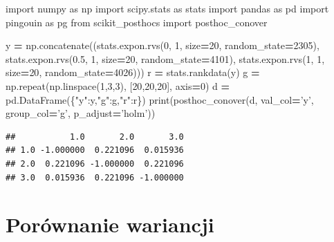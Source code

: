 \documentclass[polish,]{book}
\newenvironment{Shaded}{\begin{snugshade}}{\end{snugshade}}
\newcommand{\BuiltInTok}[1]{#1}
\newcommand{\DecValTok}[1]{\textcolor[rgb]{0.00,0.00,0.81}{#1}}
\newcommand{\FloatTok}[1]{\textcolor[rgb]{0.00,0.00,0.81}{#1}}
\newcommand{\ImportTok}[1]{#1}
\newcommand{\NormalTok}[1]{#1}
\newcommand{\OperatorTok}[1]{\textcolor[rgb]{0.81,0.36,0.00}{\textbf{#1}}}
\newcommand{\StringTok}[1]{\textcolor[rgb]{0.31,0.60,0.02}{#1}}
\begin{document}
\begin{Shaded}
\begin{Highlighting}[]
\ImportTok{import}\NormalTok{ numpy }\ImportTok{as}\NormalTok{ np}
\ImportTok{import}\NormalTok{ scipy.stats }\ImportTok{as}\NormalTok{ stats}
\ImportTok{import}\NormalTok{ pandas }\ImportTok{as}\NormalTok{ pd}
\ImportTok{import}\NormalTok{ pingouin }\ImportTok{as}\NormalTok{ pg}
\ImportTok{from}\NormalTok{ scikit_posthocs }\ImportTok{import}\NormalTok{ posthoc_conover}

\NormalTok{y }\OperatorTok{=}\NormalTok{ np.concatenate((stats.expon.rvs(}\DecValTok{0}\NormalTok{, }\DecValTok{1}\NormalTok{, size}\OperatorTok{=}\DecValTok{20}\NormalTok{, random_state}\OperatorTok{=}\DecValTok{2305}\NormalTok{),}
\NormalTok{                    stats.expon.rvs(}\FloatTok{0.5}\NormalTok{, }\DecValTok{1}\NormalTok{, size}\OperatorTok{=}\DecValTok{20}\NormalTok{, random_state}\OperatorTok{=}\DecValTok{4101}\NormalTok{),}
\NormalTok{                    stats.expon.rvs(}\DecValTok{1}\NormalTok{, }\DecValTok{1}\NormalTok{, size}\OperatorTok{=}\DecValTok{20}\NormalTok{, random_state}\OperatorTok{=}\DecValTok{4026}\NormalTok{)))}
\NormalTok{r }\OperatorTok{=}\NormalTok{ stats.rankdata(y)}
\NormalTok{g }\OperatorTok{=}\NormalTok{ np.repeat(np.linspace(}\DecValTok{1}\NormalTok{,}\DecValTok{3}\NormalTok{,}\DecValTok{3}\NormalTok{), [}\DecValTok{20}\NormalTok{,}\DecValTok{20}\NormalTok{,}\DecValTok{20}\NormalTok{], axis}\OperatorTok{=}\DecValTok{0}\NormalTok{)}
\NormalTok{d }\OperatorTok{=}\NormalTok{ pd.DataFrame(\{}\StringTok{"y"}\NormalTok{:y,}\StringTok{"g"}\NormalTok{:g,}\StringTok{"r"}\NormalTok{:r\})}
\BuiltInTok{print}\NormalTok{(posthoc_conover(d, val_col}\OperatorTok{=}\StringTok{'y'}\NormalTok{, group_col}\OperatorTok{=}\StringTok{'g'}\NormalTok{, p_adjust}\OperatorTok{=}\StringTok{'holm'}\NormalTok{))}
\end{Highlighting}
\end{Shaded}

\begin{verbatim}
##           1.0       2.0       3.0
## 1.0 -1.000000  0.221096  0.015936
## 2.0  0.221096 -1.000000  0.221096
## 3.0  0.015936  0.221096 -1.000000
\end{verbatim}

\hypertarget{R83}{%
\section{Porównanie wariancji}\label{R83}}
\end{document}
